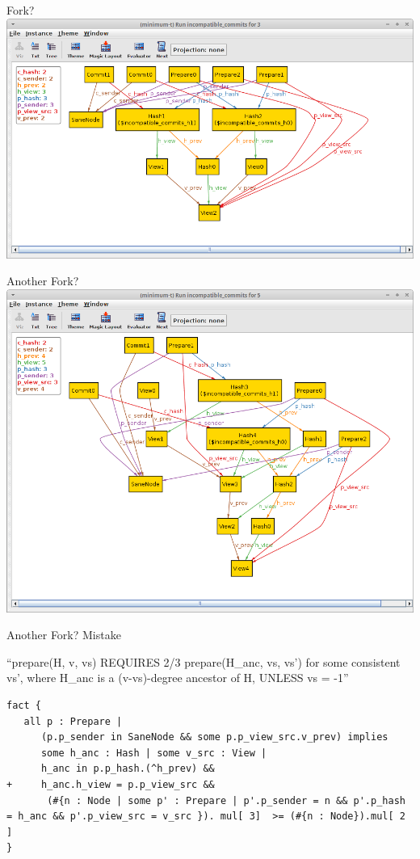 \documentclass{beamer}
\begin{document}
\begin{frame}{Fork?}
\includegraphics[width=\textwidth]{fork.png}

\end{frame}

\begin{frame}{Another Fork?}
\includegraphics[width=\textwidth]{fork2.png}
\end{frame}

\begin{frame}[fragile]{Another Fork?  Mistake}

``prepare(H, v, vs) REQUIRES 2/3 prepare(H\_anc, vs, vs') for some consistent vs', where H\_anc is a (v-vs)-degree ancestor of H, UNLESS vs = -1''

\begin{verbatim}
fact {
   all p : Prepare |
      (p.p_sender in SaneNode && some p.p_view_src.v_prev) implies
      some h_anc : Hash | some v_src : View |
      h_anc in p.p_hash.(^h_prev) &&
+     h_anc.h_view = p.p_view_src &&
       (#{n : Node | some p' : Prepare | p'.p_sender = n && p'.p_hash = h_anc && p'.p_view_src = v_src }). mul[ 3]  >= (#{n : Node}).mul[ 2 ]
}
\end{verbatim}
\end{frame}
\end{document}

